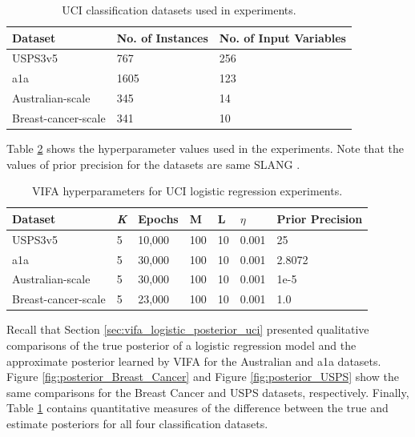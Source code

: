 \documentclass[10pt]{article} %
\begin{document}
\begin{table}[!h]
\caption{UCI classification datasets used in experiments.}
\label{table:logistic_regression_vi_posterior_uci}
\begin{center}
\begin{tabular}{l|ll}
\textbf{Dataset}    & \textbf{No. of  Instances} & \textbf{No. of Input Variables}  \\ \hline
USPS3v5             & 767                        & 256                                                    \\
a1a                 & 1605                       & 123                                                \\
Australian-scale    & 345                        & 14                                                   \\
Breast-cancer-scale & 341                        & 10                                                  
\end{tabular}
\end{center}
\end{table}

Table \ref{table:vifa_uci_logistic_hyperparameters} shows the hyperparameter values used in the experiments. Note that the values of prior precision for the datasets are same SLANG \cite{mishkin2018}.

\begin{table}[!h]
\caption{VIFA hyperparameters for UCI logistic regression experiments.}
\label{table:vifa_uci_logistic_hyperparameters}
\begin{center}
\begin{tabular}{l|llllll}
\textbf{Dataset}    & \textit{K} & \textbf{Epochs} & M   & L  & $\eta$   & \textbf{Prior Precision} \\ \hline
USPS3v5             & 5          & 10,000          & 100 & 10 & 0.001 & 25                       \\
a1a                 & 5          & 30,000          & 100 & 10 & 0.001 & 2.8072                   \\
Australian-scale    & 5          & 30,000          & 100 & 10 & 0.001 & 1e-5                     \\
Breast-cancer-scale & 5          & 23,000          & 100 & 10 & 0.001 & 1.0                     
\end{tabular}
\end{center}
\end{table}

Recall that Section \ref{sec:vifa_logistic_posterior_uci} presented qualitative comparisons of the true posterior of a logistic regression model and the approximate posterior learned by VIFA for the Australian and a1a datasets. Figure \ref{fig:posterior_Breast_Cancer} and Figure \ref{fig:posterior_USPS} show the same comparisons for the Breast Cancer and USPS datasets, respectively. Finally, Table \ref{table:logistic_regression_vi_posterior_uci} contains quantitative measures of the difference between the true and estimate posteriors for all four classification datasets.
\end{document}
